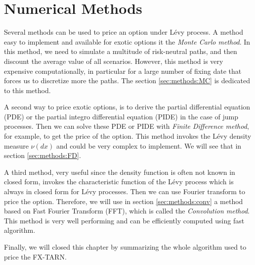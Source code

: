 \chapter{Numerical Methods}
\label{sec:methods}


Several methods can be used to price an option under L\'evy process. A method easy to implement and available for exotic options it the \textit{Monte Carlo method}. In this method, we need to simulate a multitude of risk-neutral paths, and then discount the average value of all scenarios. However, this method is very expensive computationally, in particular for a large number of fixing date that forces us to discretize more the paths. The section \ref{sec:methods:MC} is dedicated to this method.

A second way to price exotic options, is to derive the partial differential equation (PDE) or the partial integro differential equation (PIDE) in the case of jump processes. Then we can solve these PDE or PIDE with \textit{Finite Difference method}, for example, to get the price of the option. This method invokes the L\'evy density measure $\nu(dx)$ and could be very complex to implement. We will see that in section \ref{sec:methods:FD}.

A third method, very useful since the density function is often not known in closed form, invokes the characteristic function of the L\'evy process which is always in closed form for L\'evy processes. Then we can use Fourier transform to price the option. Therefore, we will use in section \ref{sec:methods:conv} a method based on Fast Fourier Transform (FFT), which is called the \textit{Convolution method}. This method is very well performing and can be efficiently computed using fast algorithm. 

Finally, we will closed this chapter by summarizing the whole algorithm used to price the FX-TARN.

